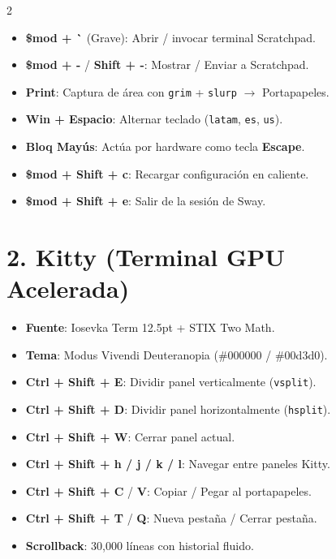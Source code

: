 \documentclass[11pt,article,spanish]{apuntes-scr}
\begin{document}
\begin{multicols*}{2}
\begin{itemize}[leftmargin=*]
    \item \textbf{\$mod + \`{}} (Grave): Abrir / invocar terminal Scratchpad.
    \item \textbf{\$mod + -} / \textbf{Shift + -}: Mostrar / Enviar a Scratchpad.
    \item \textbf{Print}: Captura de área con \texttt{grim} + \texttt{slurp} $\to$ Portapapeles.
    \item \textbf{Win + Espacio}: Alternar teclado (\texttt{latam}, \texttt{es}, \texttt{us}).
    \item \textbf{Bloq Mayús}: Actúa por hardware como tecla \textbf{Escape}.
    \item \textbf{\$mod + Shift + c}: Recargar configuración en caliente.
    \item \textbf{\$mod + Shift + e}: Salir de la sesión de Sway.
  \end{itemize}

  \section*{2. Kitty (Terminal GPU Acelerada)}
  \begin{itemize}[leftmargin=*]
    \item \textbf{Fuente}: Iosevka Term 12.5pt + STIX Two Math.
    \item \textbf{Tema}: Modus Vivendi Deuteranopia (\#000000 / \#00d3d0).
    \item \textbf{Ctrl + Shift + E}: Dividir panel verticalmente (\texttt{vsplit}).
    \item \textbf{Ctrl + Shift + D}: Dividir panel horizontalmente (\texttt{hsplit}).
    \item \textbf{Ctrl + Shift + W}: Cerrar panel actual.
    \item \textbf{Ctrl + Shift + h / j / k / l}: Navegar entre paneles Kitty.
    \item \textbf{Ctrl + Shift + C} / \textbf{V}: Copiar / Pegar al portapapeles.
    \item \textbf{Ctrl + Shift + T} / \textbf{Q}: Nueva pestaña / Cerrar pestaña.
    \item \textbf{Scrollback}: 30,000 líneas con historial fluido.
  \end{itemize}


\end{multicols*}
\end{document}
